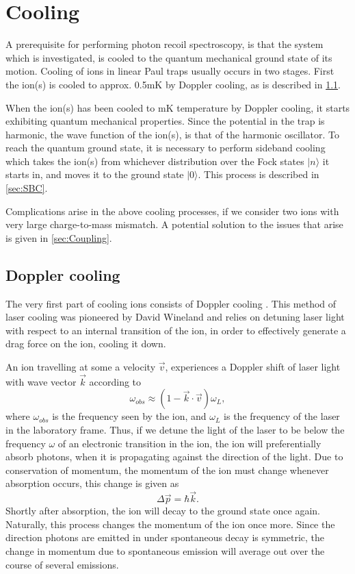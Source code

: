 \chapter{Cooling}
\label{chap:Cooling}
A prerequisite for performing photon recoil spectroscopy, is that the system which is investigated, is cooled to the quantum mechanical ground state of its motion.
Cooling of ions in linear Paul traps usually occurs in two stages. First the ion(s) is cooled to approx. 0.5mK by Doppler cooling, as is described in \cref{sec:Doppler}.

When the ion(s) has been cooled to mK temperature by Doppler cooling, it starts exhibiting quantum mechanical properties. Since the potential in the trap is harmonic, the wave function of the ion(s), is that of the harmonic oscillator.
To reach the quantum ground state, it is necessary to perform sideband cooling which takes the ion(s) from whichever distribution over the Fock states $\vert n\rangle$ it starts in, and moves it to the ground state $\vert0\rangle$. This process is described in \cref{sec:SBC}.

Complications arise in the above cooling processes, if we consider two ions with very large charge-to-mass mismatch. A potential solution to the issues that arise is given in \cref{sec:Coupling}.
\section{Doppler cooling}
\label{sec:Doppler}
The very first part of cooling ions consists of Doppler cooling \cite{WinelandLaserCool}. This method of laser cooling was pioneered by David Wineland and relies on detuning laser light with respect to an internal transition of the ion, in order to effectively generate a drag force on the ion, cooling it down.

An ion travelling at some a velocity $\vec{v}$, experiences a Doppler shift of laser light with wave vector $\vec{k}$ according to
\begin{equation}
    \omega_{obs} \approx (1-\vec{k}\cdot\vec{v})\omega_L,
\end{equation}
where $\omega_{obs}$ is the frequency seen by the ion, and $\omega_L$ is the frequency of the laser in the laboratory frame.
Thus, if we detune the light of the laser to be below the frequency $\omega$ of an electronic transition in the ion, the ion will preferentially absorb photons, when it is propagating against the direction of the light.
Due to conservation of momentum, the momentum of the ion must change whenever absorption occurs, this change is given as
\begin{equation}
    \Delta\vec{p} = \hbar\vec{k}.
\end{equation}
Shortly after absorption, the ion will decay to the ground state once again. Naturally, this process changes the momentum of the ion once more. Since the direction photons are emitted in under spontaneous decay is symmetric, the change in momentum due to spontaneous emission will average out over the course of several emissions.


